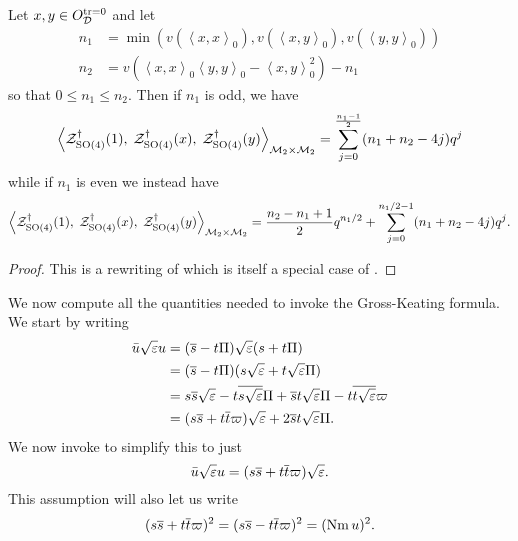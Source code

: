 \begin{proposition}
  \label{prop:GK}
  Let $x,y \in O_\mathcal D^{\operatorname{tr} = 0}$ and let
  \begin{align*}
    n_1 &= \min\left( v(\left\langle x,x \right\rangle _0), v(\left\langle x,y \right\rangle _0), v(\left\langle y,y \right\rangle _0) \right) \\
    n_2 &= v\left( \left\langle x,x \right\rangle _0 \left\langle y,y \right\rangle _0 - \left\langle x,y \right\rangle^2_0 \right) - n_1
  \end{align*}
  so that $0 \le n_1 \le n_2$.
  Then if $n_1$ is odd, we have
  \[
    \left< \mathcal Z^{\dagger}_{\operatorname{SO}(4)}(1), \; \mathcal Z^{\dagger}_{\operatorname{SO}(4)}(x), \; \mathcal Z^{\dagger}_{\operatorname{SO}(4)}(y) \right>_{\mathcal M_2 \times \mathcal M_2}
    = \sum_{j=0}^{\frac{n_1-1}{2}} (n_1+n_2-4j) q^j
  \]
  while if $n_1$ is even we instead have
  \[
    \left< \mathcal Z^{\dagger}_{\operatorname{SO}(4)}(1), \; \mathcal Z^{\dagger}_{\operatorname{SO}(4)}(x), \; \mathcal Z^{\dagger}_{\operatorname{SO}(4)}(y) \right>_{\mathcal M_2 \times \mathcal M_2}
    = \frac{n_2-n_1+1}{2} q^{n_1/2} + \sum_{j=0}^{n_1/2-1} (n_1+n_2-4j) q^j.
  \]
\end{proposition}
\begin{proof}
  This is a rewriting of \cite[Proposition 14.6]{ref:Kudla1997}
  which is itself a special case of \cite[Proposition 5.4]{ref:GK}.
\end{proof}

We now compute all the quantities needed to invoke the Gross-Keating formula.
We start by writing
\begin{align*}
  \bar u \sqrt{\varepsilon} u
  &= (\overline s - t \Pi) \sqrt{\varepsilon} (s + t \Pi) \\
  &= (\overline s - t \Pi) (s \sqrt{\varepsilon} + t \sqrt{\varepsilon} \Pi) \\
  &= s \overline s \sqrt{\varepsilon} - t \overline{s\sqrt{\varepsilon}} \Pi + \overline s t \sqrt{\varepsilon} \Pi - t \overline{t \sqrt{\varepsilon}} \varpi \\
  &= (s \overline s + t \overline t \varpi) \sqrt{\varepsilon} + 2 \overline s t \sqrt{\varepsilon} \Pi.
\end{align*}
We now invoke  to simplify this to just
\[ \bar u \sqrt{\varepsilon} u = (s \overline s + t \overline t \varpi) \sqrt{\varepsilon}. \]
This assumption will also let us write
\[ (s \overline s + t \overline t \varpi)^2 = (s \overline s - t \overline t \varpi)^2 = (\operatorname{Nm} u)^2. \]

